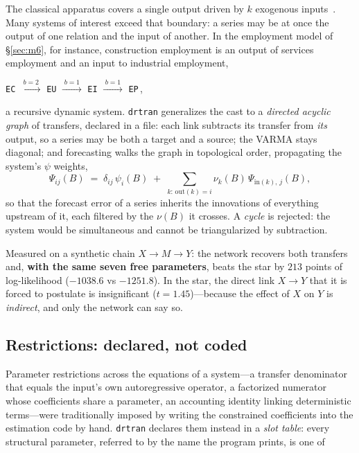 \documentclass[11pt,a4paper]{article}
\theoremstyle{plain}
\theoremstyle{remark}
\begin{document}
The classical apparatus covers a single output driven by $k$ exogenous
inputs~\cite[chs.~10--11]{bjr1994}. Many systems of interest exceed that boundary:
a series may be at once the output of one relation and the input of another. In the
employment model of \S\ref{sec:m6}, for instance, construction employment is an
output of services employment and an input to industrial employment,
\begin{center}
\texttt{EC} $\xrightarrow{\;b=2\;}$ \texttt{EU} $\xrightarrow{\;b=1\;}$
\texttt{EI} $\xrightarrow{\;b=1\;}$ \texttt{EP}\,,
\end{center}
a recursive dynamic system. \texttt{drtran} generalizes the cast to a
\emph{directed acyclic graph} of transfers, declared in a file: each link subtracts
its transfer from \emph{its} output, so a series may be both a target and a source;
the VARMA stays diagonal; and forecasting walks the graph in topological order,
propagating the system's $\psi$ weights,
\begin{equation}
\Psi_{ij}(B) \;=\; \delta_{ij}\,\psi_i(B)
   \;+\; \sum_{k:\,\mathrm{out}(k)=i} \nu_k(B)\,\Psi_{\mathrm{in}(k),\,j}(B),
\end{equation}
so that the forecast error of a series inherits the innovations of everything
upstream of it, each filtered by the $\nu(B)$ it crosses. A \emph{cycle} is
rejected: the system would be simultaneous and cannot be triangularized by
subtraction.

Measured on a synthetic chain $X \rightarrow M \rightarrow Y$: the network
recovers both transfers and, \textbf{with the same seven free parameters}, beats
the star by $213$ points of log-likelihood ($-1038.6$ vs $-1251.8$). In the star,
the direct link $X\rightarrow Y$ that it is forced to postulate is insignificant
($t=1.45$)---because the effect of $X$ on $Y$ is \emph{indirect}, and only the
network can say so.

\subsection{Restrictions: declared, not coded}
\label{sec:restrictions}

Parameter restrictions across the equations of a system---a transfer denominator
that equals the input's own autoregressive operator, a factorized numerator whose
coefficients share a parameter, an accounting identity linking deterministic
terms---were traditionally imposed by writing the constrained coefficients into the
estimation code by hand. \texttt{drtran} declares them instead in a \emph{slot
table}: every structural parameter, referred to by the name the program prints, is
one of
\end{document}
